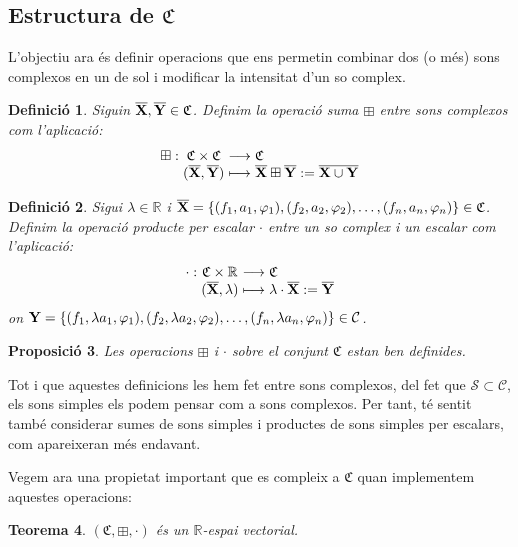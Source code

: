 \documentclass{article}
\theoremstyle{math}
\newtheorem{definition}{Definició}[section]
\newtheorem{theorem}[definition]{Teorema}
\newtheorem{prop}[definition]{Proposició}
\newcommand{\0}{\ensuremath{\vb{0}}}
\newcommand{\X}{\ensuremath{\vb{X}}}
\newcommand{\Y}{\ensuremath{\vb{Y}}}
\newcommand{\RR}{\ensuremath{\mathbb{R}}} %
\begin{document}
\subsection{Estructura de \texorpdfstring{$\mathfrak{C}$}{C}}
L'objectiu ara és definir operacions que ens permetin combinar dos (o més) sons complexos en un de sol i modificar la intensitat d'un so complex.
\begin{definition}
    Siguin $\overline{\X},\overline{\Y}\in\mathfrak{C}$. Definim la operació \textit{suma $\boxplus$} entre sons complexos com l'aplicació:
    \begin{equation*}
        \begin{array}{r@{\hspace{0.5\tabcolsep}}c@{\hspace{0.5\tabcolsep}}c@{\hspace{0.5\tabcolsep}}l}
            \boxplus:&\mathfrak{C}\times\mathfrak{C}&\longrightarrow&\mathfrak{C}\\
            &(\overline{\X},\overline{\Y})&\longmapsto&\overline{\X}\boxplus \overline{\Y}:=\overline{\X\cup\Y}
        \end{array}
    \end{equation*}
\end{definition}
\begin{definition}
    Sigui $\lambda\in\RR$ i $\overline{\X}=\{(f_1,a_1,\varphi_1),(f_2,a_2,\varphi_2),\ldots,(f_n,a_n,\varphi_n)\}\in\mathfrak{C}$. Definim la operació \textit{producte per escalar $\cdot$} entre un so complex i un escalar com l'aplicació:
    \begin{equation*}
        \begin{array}{r@{\hspace{0.5\tabcolsep}}c@{\hspace{0.5\tabcolsep}}c@{\hspace{0.5\tabcolsep}}l}
            \cdot:&\mathfrak{C}\times\RR&\longrightarrow&\mathfrak{C}\\
            &(\overline{\X},\lambda)&\longmapsto&\lambda\cdot \overline{\X}:=\overline{\Y}
        \end{array}
    \end{equation*}
    on $\Y=\{(f_1,\lambda a_1,\varphi_1),(f_2,\lambda a_2,\varphi_2),\ldots,(f_n,\lambda a_n,\varphi_n)\}\in\mathcal{C}$.
\end{definition}
\begin{prop}
    Les operacions $\boxplus$ i $\cdot$ sobre el conjunt $\mathfrak{C}$ estan ben definides.
\end{prop}
Tot i que aquestes definicions les hem fet entre sons complexos, del fet que $\mathcal{S}\subset\mathcal{C}$, els sons simples els podem pensar com a sons complexos. Per tant, té sentit també considerar sumes de sons simples i productes de sons simples per escalars, com apareixeran més endavant.\par
Vegem ara una propietat important que es compleix a $\mathfrak{C}$ quan implementem aquestes operacions:
\begin{theorem}
    $(\mathfrak{C},\boxplus,\cdot)$ és un $\RR$-espai vectorial.
\end{theorem}
\end{document}
